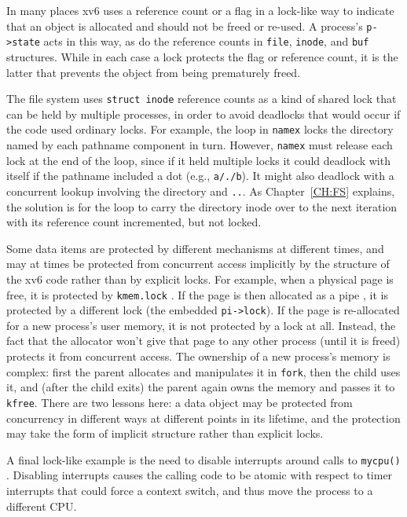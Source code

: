 In many places xv6 uses a reference count or a flag in a lock-like way
to indicate that an object is allocated and should not be freed
or re-used. A process's {\tt p->state} acts in this way, as do the
reference counts in {\tt file}, {\tt inode}, and {\tt buf} structures.
While in each case a lock protects the flag or reference count, it is
the latter that prevents the object from being prematurely freed.

The file system uses {\tt struct inode} reference counts as a kind of
shared lock that can be held by multiple processes, in order to avoid
deadlocks that would occur if the code used ordinary locks. For
example, the loop in {\tt namex}  locks
the directory named by each pathname component in turn. However, {\tt namex}
must release each lock at the end of the loop, since if it
held multiple locks it could deadlock with itself if the pathname
included a dot (e.g., {\tt a/./b}). It might also deadlock with a
concurrent lookup involving the directory and {\tt ..}. As
Chapter~\ref{CH:FS} explains, the solution is for the loop to carry
the directory inode over to the next iteration with its reference
count incremented, but not locked.

Some data items are protected by different mechanisms at different
times, and may at times be protected from concurrent access implicitly
by the structure of the xv6 code rather than by explicit locks. For
example, when a physical page is free, it is protected by \texttt{kmem.lock}
. If the page is then
allocated as a pipe , it is
protected by a different lock (the embedded \lstinline{pi->lock}). If the page
is re-allocated for a new process's user memory, it is not protected by a
lock at all. Instead, the fact that the allocator won't give that page
to any other process (until it is freed) protects it from concurrent
access. 
The ownership of a new process's memory is complex:
first the parent allocates and
manipulates it in {\tt fork}, then the child uses it, and (after the
child exits) the parent again owns the memory and passes it to {\tt
  kfree}. There are two lessons here: a data object may be protected
from concurrency in different ways at different points in its
lifetime, and the protection may take the form of implicit structure
rather than explicit locks.

A final lock-like example is the need to disable interrupts around
calls to {\tt mycpu()} . Disabling
interrupts causes the calling code to be atomic with respect to timer
interrupts that could force a context switch, and thus move the
process to a different CPU.


